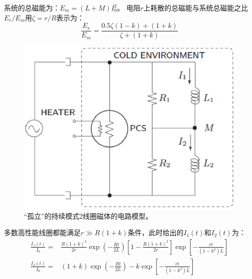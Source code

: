 系统的总磁能为：$E_m=(L+M)I_0^2$。
电阻$r$上耗散的总磁能与系统总磁能之比$E_r/E_m$用$\zeta=r/R$表示为：
\begin{equation}%
\frac{E_r}{E_m}=\frac{0.5\zeta(1-k)+(1+k)}{\zeta+(1+k)}
\end{equation}

\begin{figure}
	\centering
	\includegraphics[scale=0.6]{chpt8/figs/fig8.13.eps}
	\caption{“孤立”的持续模式2线圈磁体的电路模型。}
\end{figure}

多数高性能线圈都能满足$r\gg R(1+k)$条件，此时给出的$I_1(t)$和$I_2(t)$为：
\begin{subequations}
	\begin{align}
\frac{I_1(t)}{I_0}=&\frac{R(1+k)^2}{2r}\exp\left(-\frac{Rt}{2L}\right)\left[1-\frac{R(1+k)^2}{2r}\right]\exp\left[-\frac{rt}{(1-k^2)L}\right]\\
	\frac{I_2(t)}{I_0}=&(1+k)\exp\left(-\frac{Rt}{2L}\right)-k\exp\left[-\frac{rt}{(1-k^2)L}\right]
	\end{align}
\end{subequations}

